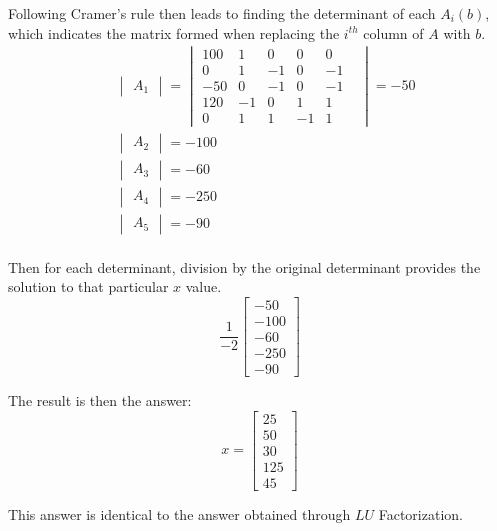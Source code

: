 \documentclass[paper.tex]{subfiles}
\begin{document}
Following Cramer's rule then leads to finding the determinant of each $A_i(b)$, which indicates the matrix formed when replacing the $i^{th}$ column of $A$ with $b$.
\begin{align*}
    &\begin{vmatrix}A_1\end{vmatrix} = \begin{vmatrix}
        100 & 1 & 0 & 0 & 0   \\
        0 & 1 & -1 & 0 & -1 \\
        -50 & 0 & -1 & 0 & -1 \\
        120 & -1 & 0 & 1 & 1  \\
        0 & 1 & 1 & -1 & 1
    &\end{vmatrix} = -50\\
    &\begin{vmatrix}A_2\end{vmatrix} = -100 \\ 
    &\begin{vmatrix}A_3\end{vmatrix} = -60 \\ 
    &\begin{vmatrix}A_4\end{vmatrix} = -250 \\
    &\begin{vmatrix}A_5\end{vmatrix} = -90 \\
\end{align*}

Then for each determinant, division by the original determinant provides the solution to that particular $x$ value.
\begin{equation*}
    \frac{1}{-2} \begin{bmatrix}
        -50 \\
        -100 \\
        -60 \\
        -250 \\
        -90
    \end{bmatrix}
\end{equation*}

The result is then the answer:
\begin{equation*}
    x = \begin{bmatrix}
        25 \\
        50 \\ 
        30 \\ 
        125 \\
        45
    \end{bmatrix}
\end{equation*}

This answer is identical to the answer obtained through $LU$ Factorization.
\end{document}
